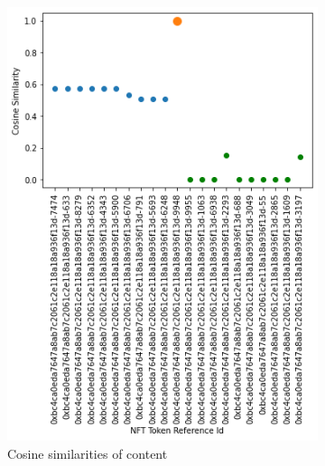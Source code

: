 \begin{figure}[h!]
     \centering
     \begin{subfigure}[b]{0.45\textwidth}
         \centering
         \includegraphics[width=\textwidth]{images/Testing/trait/Cosine Similarities of Recommended NFTs (Trait Content Based + Total Rarity Recomendations Models).png}
         \caption{Cosine similarities of content}
         \label{fig:1-1}
     \end{subfigure}
     \hfill
     \begin{subfigure}[b]{0.45\textwidth}
         \centering

\end{subfigure}
\end{figure}

